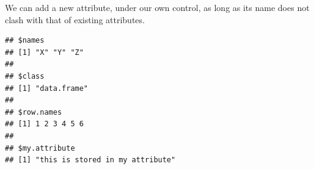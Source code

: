 \documentclass[krantz2]{krantz}\usepackage{knitr}
\begin{document}
We can add a new attribute, under our own control, as long as its name does not clash with that of existing attributes.

\begin{knitrout}\footnotesize
{}\color{fgcolor}\begin{kframe}
\begin{alltt}
 \hlstd{)} \hlkwb{<-} 
\end{alltt}
\begin{verbatim}
## $names
## [1] "X" "Y" "Z"
## 
## $class
## [1] "data.frame"
## 
## $row.names
## [1] 1 2 3 4 5 6
## 
## $my.attribute
## [1] "this is stored in my attribute"
\end{verbatim}
\end{kframe}
\end{knitrout}
\end{document}
